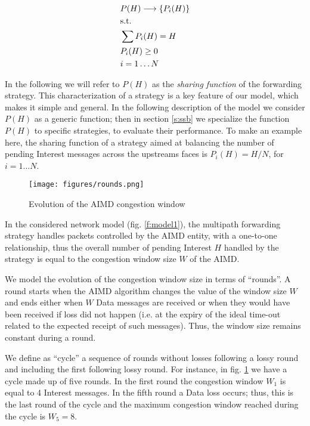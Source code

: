 \documentclass{sig-alternate-10pt}
\begin{document}
\begin{equation}
\begin{aligned}
& P(H) \longrightarrow \{ P_i(H) \} \\
& \text{s.t.} \\
&\sum P_i(H) = H \\
&P_i(H) \geq 0 \\
&i=1 \dots N \\
\label{eq:0}
\end{aligned}
\vspace{-12pt}
\end{equation}

In the following we will refer to  $P(H)$ as the \emph{sharing function} of the forwarding strategy. This characterization of a strategy is a key feature of our model, which makes it simple and general. In the following description of the model we consider $P(H)$ as a generic function; then in section \ref{s:ssb} we specialize the function $P(H)$ to specific strategies, to evaluate their performance.
To make an example here, the sharing function of a strategy aimed at balancing the number of pending Interest messages across the upstreams faces is $P_i(H) = H/N$, for $i=1 \dots N$.




\begin{figure}[t]
\centering
\texttt{[image: figures/rounds.png]}
\caption{Evolution of the AIMD congestion window}
\label{f:model2}
\vspace{-10pt}
\end{figure}

In the considered network model (fig. \ref{f:model1}), the multipath forwarding strategy handles packets controlled by the AIMD entity, with a one-to-one relationship, thus the overall number of pending Interest $H$ handled by the strategy is equal to the congestion window size $W$ of the AIMD.

We model the evolution of the congestion window size in terms of ``rounds''. A round starts when the AIMD algorithm changes the value of the window size $W$ and ends either when $W$ Data messages are received or when they would have been received if loss did not happen (i.e. at the expiry of the ideal time-out related to the expected receipt of such messages). Thus, the window size remains constant during a round.

We define as ``cycle'' a sequence of rounds without losses following a lossy round and including the first following lossy round. 
For instance, in fig. \ref{f:model2} we have a cycle made up of five rounds. In the first round the congestion window $W_1$ is equal to 4 Interest messages. In the fifth round a Data loss occurs; thus, this is the last round of the cycle and the maximum congestion window reached during the cycle is $W_5=8$.
\end{document}
